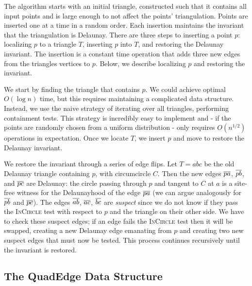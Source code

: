 The algorithm starts with an initial triangle, constructed such that it contains
all input points and is large enough to not affect the points' triangulation.
Points are inserted one at a time in a random order. Each insertion maintains
the invariant that the triangulation is Delaunay. There are three steps to
inserting a point $p$: localizing $p$ to a triangle $T$, inserting $p$ into
$T$, and restoring the Delaunay invariant. The insertion is a constant time
operation that adds three new edges from the triangles vertices to $p$. Below,
we describe localizing $p$ and restoring the invariant.

We start by finding the triangle that contains $p$. We could achieve optimal
$O(\log n)$ time, but this requires maintaining a complicated data structure.
Instead, we use the naive strategy of iterating over all triangles,
performing containment tests.  This strategy is incredibly easy to implement and 
- if the points are randomly chosen from a uniform distribution - only requires
$O(n^{1/2})$ operations in expectation. Once we locate $T$, we insert $p$ and
move to restore the Delaunay invariant.

We restore the invariant through a series of edge flips. Let $T = abc$ be the
old Delaunay triangle containing $p$, with circumcircle $C$. Then the new edges
$\seg{pa}$, $\seg{pb}$, and $\seg{pc}$ are Delaunay: the circle passing through
$p$ and tangent to $C$ at $a$ is a site-free witness for the Delaunayhood of the
edge $\seg{pa}$ (we can argue analogously for $\seg{pb}$ and $\seg{pc}$). The
edges $\seg{ab}$, $\seg{ac}$, $\seg{bc}$ are {\em suspect} since we do not know
if they pass the \textsc{InCircle} test with respect to $p$ and the triangle on
their other side. We have to check these suspect edges; if an edge fails the
\textsc{InCircle} test then it will be swapped, creating a new Delaunay edge
emanating from $p$ and creating two new suspect edges that must now be tested.
This process continues recursively until the invariant is restored.


\FloatBarrier
\subsection{The QuadEdge Data Structure}



